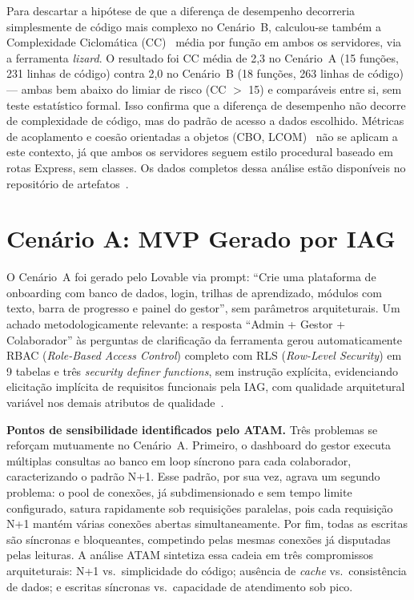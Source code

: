 \documentclass[sigconf]{acmart}
\begin{document}
Para descartar a hipótese de que a diferença de desempenho decorreria simplesmente de código mais complexo no Cenário~B, calculou-se também a Complexidade Ciclomática (CC)~\cite{McCabe1976} média por função em ambos os servidores, via a ferramenta \textit{lizard}. O resultado foi CC média de 2,3 no Cenário~A (15 funções, 231 linhas de código) contra 2,0 no Cenário~B (18 funções, 263 linhas de código) — ambas bem abaixo do limiar de risco (CC $>$ 15) e comparáveis entre si, sem teste estatístico formal. Isso confirma que a diferença de desempenho não decorre de complexidade de código, mas do padrão de acesso a dados escolhido. Métricas de acoplamento e coesão orientadas a objetos (CBO, LCOM)~\cite{Chidamber1994} não se aplicam a este contexto, já que ambos os servidores seguem estilo procedural baseado em rotas Express, sem classes. Os dados completos dessa análise estão disponíveis no repositório de artefatos~\cite{GenAIDebt2026}.

\section{Cenário A: MVP Gerado por IAG}

O Cenário~A foi gerado pelo Lovable via prompt: ``Crie uma plataforma de onboarding
com banco de dados, login, trilhas de aprendizado, módulos com texto, barra de
progresso e painel do gestor'', sem parâmetros arquiteturais. Um achado
metodologicamente relevante: a resposta ``Admin + Gestor + Colaborador'' às perguntas
de clarificação da ferramenta gerou automaticamente RBAC (\textit{Role-Based Access
Control}) completo com RLS (\textit{Row-Level Security}) em 9 tabelas e três
\textit{security\- definer\- functions}, sem instrução explícita, evidenciando
elicitação implícita de requisitos funcionais pela IAG, com qualidade arquitetural
variável nos demais atributos de qualidade~\cite{ISO25010}.

\textbf{Pontos de sensibilidade identificados pelo ATAM.} Três problemas se reforçam mutuamente no Cenário~A. Primeiro, o dashboard do gestor executa múltiplas consultas ao banco em loop síncrono para cada colaborador, caracterizando o padrão N+1. Esse padrão, por sua vez, agrava um segundo problema: o pool de conexões, já subdimensionado e sem tempo limite configurado, satura rapidamente sob requisições paralelas, pois cada requisição N+1 mantém várias conexões abertas simultaneamente. Por fim, todas as escritas são síncronas e bloqueantes, competindo pelas mesmas conexões já disputadas pelas leituras. A análise ATAM sintetiza essa cadeia em três compromissos arquiteturais: N+1 vs.\ simplicidade do código; ausência de \textit{cache} vs.\ consistência de dados; e escritas síncronas vs.\ capacidade de atendimento sob pico.
\end{document}
